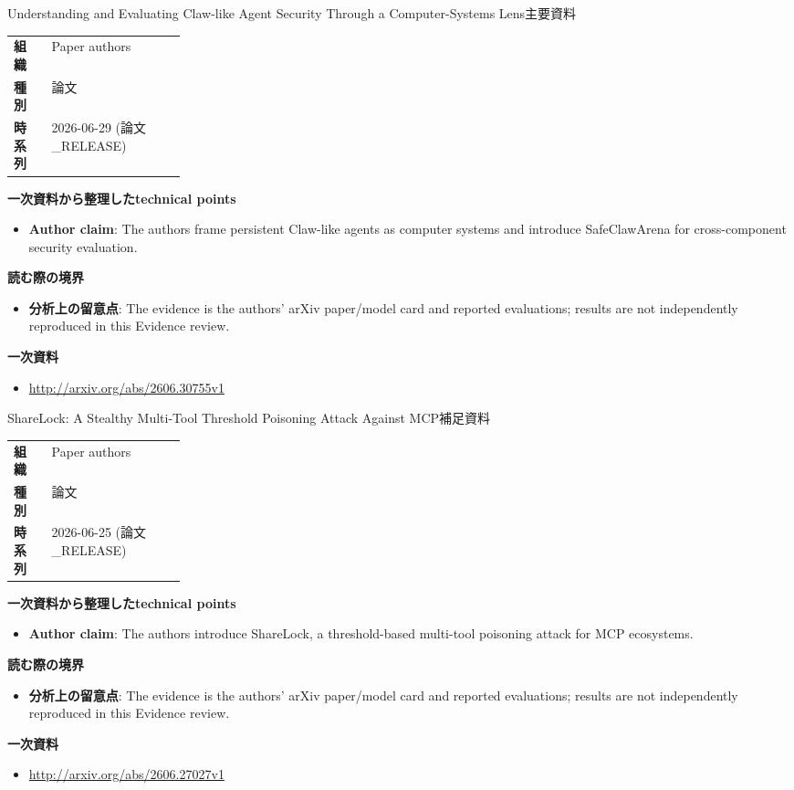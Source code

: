 \begin{technicalnote}{Understanding and Evaluating Claw-like Agent Security Through a Computer-Systems Lens}{主要資料}
\begin{tabularx}{\linewidth}{@{}>{\bfseries}p{0.22\linewidth}X@{}}
組織 & Paper authors \\
種別 & 論文 \\
時系列 & 2026-06-29 (論文\_RELEASE) \\
\end{tabularx}
\smallskip
{\bfseries 一次資料から整理したtechnical points}
\begin{itemize}[leftmargin=1.5em,itemsep=0.35em]
\item \textbf{Author claim}: The authors frame persistent Claw-like agents as computer systems and introduce SafeClawArena for cross-component security evaluation.
\end{itemize}
{\bfseries 読む際の境界}
\begin{itemize}[leftmargin=1.5em,itemsep=0.35em]
\item \textbf{分析上の留意点}: The evidence is the authors' arXiv paper/model card and reported evaluations; results are not independently reproduced in this Evidence review.
\end{itemize}
{\bfseries 一次資料}
\begingroup\sloppy
\begin{itemize}[leftmargin=1.5em,itemsep=0.25em]
\item {\scriptsize\url{http://arxiv.org/abs/2606.30755v1}}
\end{itemize}
\endgroup
\end{technicalnote}
\medskip

\begin{technicalnote}{ShareLock: A Stealthy Multi-Tool Threshold Poisoning Attack Against MCP}{補足資料}
\begin{tabularx}{\linewidth}{@{}>{\bfseries}p{0.22\linewidth}X@{}}
組織 & Paper authors \\
種別 & 論文 \\
時系列 & 2026-06-25 (論文\_RELEASE) \\
\end{tabularx}
\smallskip
{\bfseries 一次資料から整理したtechnical points}
\begin{itemize}[leftmargin=1.5em,itemsep=0.35em]
\item \textbf{Author claim}: The authors introduce ShareLock, a threshold-based multi-tool poisoning attack for MCP ecosystems.
\end{itemize}
{\bfseries 読む際の境界}
\begin{itemize}[leftmargin=1.5em,itemsep=0.35em]
\item \textbf{分析上の留意点}: The evidence is the authors' arXiv paper/model card and reported evaluations; results are not independently reproduced in this Evidence review.
\end{itemize}
{\bfseries 一次資料}
\begingroup\sloppy
\begin{itemize}[leftmargin=1.5em,itemsep=0.25em]
\item {\scriptsize\url{http://arxiv.org/abs/2606.27027v1}}
\end{itemize}
\endgroup
\end{technicalnote}
\medskip

